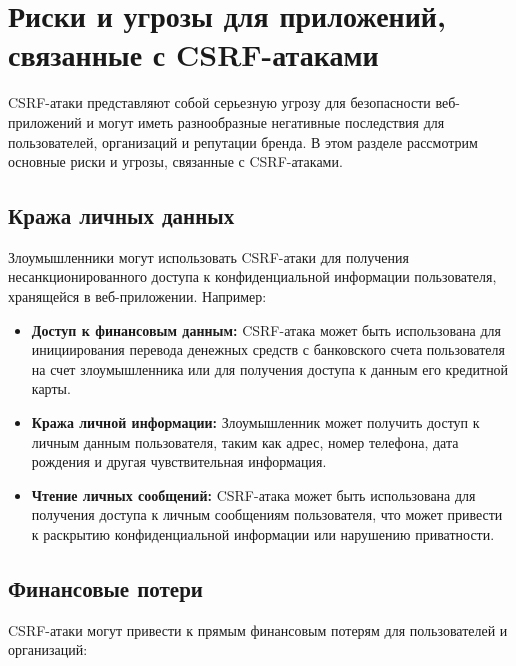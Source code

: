 \documentclass[a4paper,12pt]{diplom}
\begin{document}
	 
	 
	 
	 
	 
	 
	 
	 
	 \section{Риски и угрозы для приложений, связанные с CSRF-атаками}
	 
	 CSRF-атаки представляют собой серьезную угрозу для безопасности веб-приложений и могут иметь разнообразные негативные последствия для пользователей, организаций и репутации бренда.  В этом разделе рассмотрим основные риски и угрозы, связанные с CSRF-атаками.
	 
	 \subsection{Кража личных данных}
	 
	 Злоумышленники могут использовать CSRF-атаки для получения несанкционированного доступа к конфиденциальной информации пользователя, хранящейся в веб-приложении.  Например:
	 
	 \begin{itemize}
	 	\item \textbf{Доступ к финансовым данным:}  CSRF-атака может быть использована для инициирования перевода денежных средств с банковского счета пользователя на счет злоумышленника или для получения доступа к данным его кредитной карты.
	 	\item \textbf{Кража личной информации:}  Злоумышленник может получить доступ к личным данным пользователя, таким как адрес, номер телефона, дата рождения и другая чувствительная информация.
	 	\item \textbf{Чтение личных сообщений:}  CSRF-атака может быть использована для получения доступа к личным сообщениям пользователя, что может привести к раскрытию конфиденциальной информации или нарушению приватности.
	 \end{itemize}
	 
	 \subsection{Финансовые потери}
	 
	 CSRF-атаки могут привести к прямым финансовым потерям для пользователей и организаций:
	 
\end{document}
